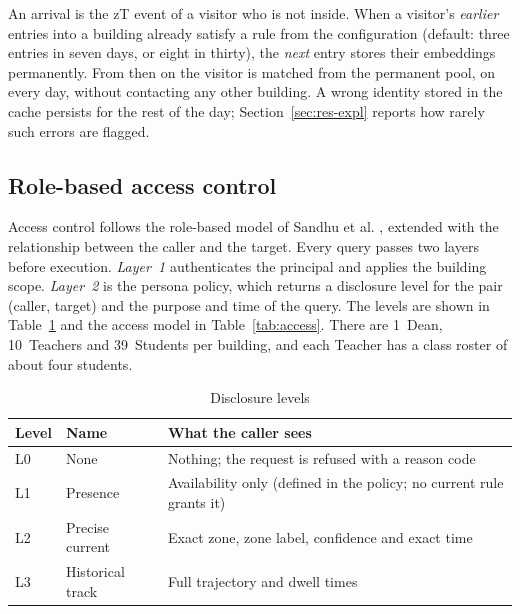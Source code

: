 \documentclass[12pt,a4paper,oneside]{report}
\begin{document}
An arrival is the zT event of a visitor who is not inside. When a visitor's \emph{earlier} entries into a building already satisfy a rule from the configuration (default: three entries in seven days, or eight in thirty), the \emph{next} entry stores their embeddings permanently. From then on the visitor is matched from the permanent pool, on every day, without contacting any other building. A wrong identity stored in the cache persists for the rest of the day; Section~\ref{sec:res-expl} reports how rarely such errors are flagged.

\subsection{Role-based access control}
Access control follows the role-based model of Sandhu et al. \cite{ref21}, extended with the relationship between the caller and the target. Every query passes two layers before execution. \emph{Layer~1} authenticates the principal and applies the building scope. \emph{Layer~2} is the persona policy, which returns a disclosure level for the pair (caller, target) and the purpose and time of the query. The levels are shown in Table~\ref{tab:levels} and the access model in Table~\ref{tab:access}. There are 1~Dean, 10~Teachers and 39~Students per building, and each Teacher has a class roster of about four students.

\begin{table}[htbp]
\centering
\caption{Disclosure levels}\label{tab:levels}
{\small\setlength{\tabcolsep}{4pt}\renewcommand{\arraystretch}{1.2}
\begin{tabular}{|p{1.17cm}|p{4.11cm}|p{9.00cm}|}\hline
\textbf{Level} & \textbf{Name} & \textbf{What the caller sees}\\\hline
L0 & None & Nothing; the request is refused with a reason code\\\hline
L1 & Presence & Availability only (defined in the policy; no current rule grants it)\\\hline
L2 & Precise current & Exact zone, zone label, confidence and exact time\\\hline
L3 & Historical track & Full trajectory and dwell times\\\hline
\end{tabular}}
\end{table}
\end{document}

